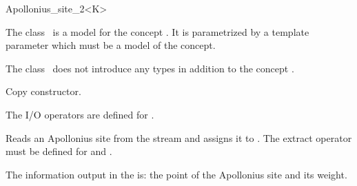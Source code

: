 

\begin{ccRefClass}{Apollonius_site_2<K>}  %


\ccDefinition
  
The class \ccRefName\ is a model for the concept
. It is parametrized by a template parameter
 which must be a model of the  concept.


\ccIsModel
{}

\ccTypes

The class \ccRefName\ does not introduce any types in addition to the
concept .


\ccCreation
{}  %
\ccGlue
{}
{Copy constructor.}


The I/O operators are defined for .


{Reads an Apollonius site from the stream  and assigns it
to \ccVar.
\ccPrecond The extract operator must be defined for  and
                  .}

The information output  in the  is: the point of the
Apollonius site and its weight.


\end{ccRefClass}
